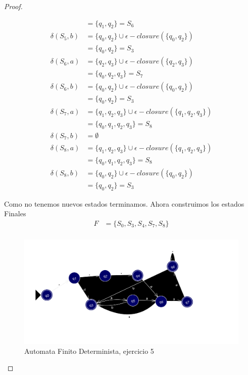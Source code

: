 \begin{proof}
\begin{enumerate}
\begin{align*}
            &= \{q_1,q_2\} = S_6 \\
            \delta(S_5,b) &= \{q_0,q_2\} \cup \epsilon-closure(\{q_0,q_2\}) \\
            &= \{q_0,q_2\} = S_3 \\
            \delta(S_6,a) &= \{q_2,q_3\} \cup \epsilon-closure(\{q_2,q_3\}) \\
            &= \{q_0,q_2,q_3\} = S_7 \\
            \delta(S_6,b) &= \{q_0,q_2\} \cup \epsilon-closure(\{q_0,q_2\}) \\
            &= \{q_0,q_2\} = S_3 \\
            \delta(S_7,a) &= \{q_1,q_2,q_3\} \cup \epsilon-closure(\{q_1,q_2,q_3\}) \\
            &= \{q_0,q_1,q_2,q_3\} = S_8 \\
            \delta(S_7,b) &= \emptyset \\ 
            \delta(S_8,a) &= \{q_1,q_2,q_3\} \cup \epsilon-closure(\{q_1,q_2,q_3\}) \\
            &= \{q_0,q_1,q_2,q_3\} = S_8 \\
            \delta(S_8,b) &= \{q_0,q_2\} \cup \epsilon-closure(\{q_0,q_2\}) \\
            &= \{q_0,q_2\} = S_3   
        \end{align*}

        Como no tenemos nuevos estados terminamos. Ahora construimos los estados Finales
        \begin{align*}
            F &= \{S_0,S_3,S_4,S_7,S_8\} \\
        \end{align*}
    \end{enumerate}
    \begin{figure}
            \centering
            \includegraphics[width=\textwidth]{images/ejercicio5-bueno-dark.png}
            \caption{Automata Finito Determinista, ejercicio 5}
    \end{figure}
\end{proof}